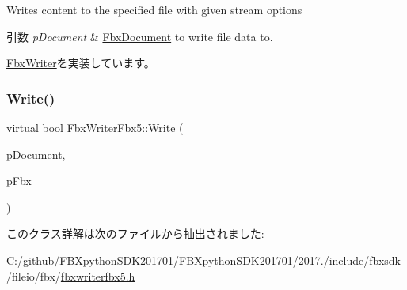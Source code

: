 Writes content to the specified file with given stream options 
\begin{DoxyParams}{引数}
{\em p\+Document} & \hyperlink{class_fbx_document}{Fbx\+Document} to write file data to. \\
\hline
\end{DoxyParams}


\hyperlink{class_fbx_writer_aa8c0277611da0fdb0b9a184c55c30c2c}{Fbx\+Writer}を実装しています。

\mbox{\label{class_fbx_writer_fbx5_ada64b2a137b4a93815496927725dc482}} 
\subsubsection{\texorpdfstring{Write()}{Write()}\hspace{0.1cm}{\footnotesize\ttfamily [2/2]}}
{\footnotesize\ttfamily virtual bool Fbx\+Writer\+Fbx5\+::\+Write (\begin{DoxyParamCaption}\item[{\hyperlink{class_fbx_document}{Fbx\+Document} $\ast$}]{p\+Document,  }\item[{\hyperlink{class_fbx_i_o}{Fbx\+IO} $\ast$}]{p\+Fbx }\end{DoxyParamCaption})\hspace{0.3cm}{\ttfamily [virtual]}}



このクラス詳解は次のファイルから抽出されました\+:\begin{DoxyCompactItemize}
\item 
C\+:/github/\+F\+B\+Xpython\+S\+D\+K201701/\+F\+B\+Xpython\+S\+D\+K201701/2017./include/fbxsdk/fileio/fbx/\hyperlink{fbxwriterfbx5_8h}{fbxwriterfbx5.\+h}\end{DoxyCompactItemize}
